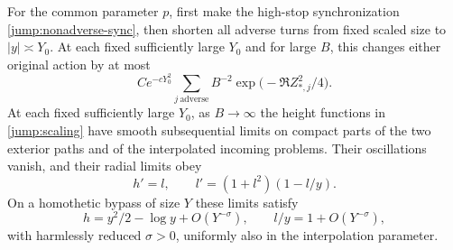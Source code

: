 \begin{lemma}\label{jump:endpoints}
For the common parameter $p$, first make the high-stop synchronization
\eqref{jump:nonadverse-sync}, then shorten all adverse turns
from fixed scaled size to $|y|\asymp Y_0$.  At each fixed sufficiently
large $Y_0$ and for large $B$, this changes either original action by at most
\begin{equation}\label{jump:endpoint-bound}
 C e^{-cY_0^2}\sum_{j\ \mathrm{adverse}}
 B^{-2}\exp\bigl(-\Re Z_{*,j}^2/4\bigr).
\end{equation}
At each fixed sufficiently large $Y_0$, as $B\to\infty$ the height
functions in \eqref{jump:scaling} have smooth subsequential limits
on compact parts of the two exterior paths and of the interpolated
incoming problems.  Their oscillations vanish, and their radial
limits obey
\begin{equation}\label{jump:translator}
 h'=l,\qquad l'=(1+l^2)(1-l/y).
\end{equation}
On a homothetic bypass of size $Y$ these limits satisfy
\begin{equation}\label{jump:translator-matching}
 h=y^2/2-\log y+O(Y^{-\sigma}),\qquad
 l/y=1+O(Y^{-\sigma}),
\end{equation}
with harmlessly reduced $\sigma>0$, uniformly also in the
interpolation parameter.
\end{lemma}

